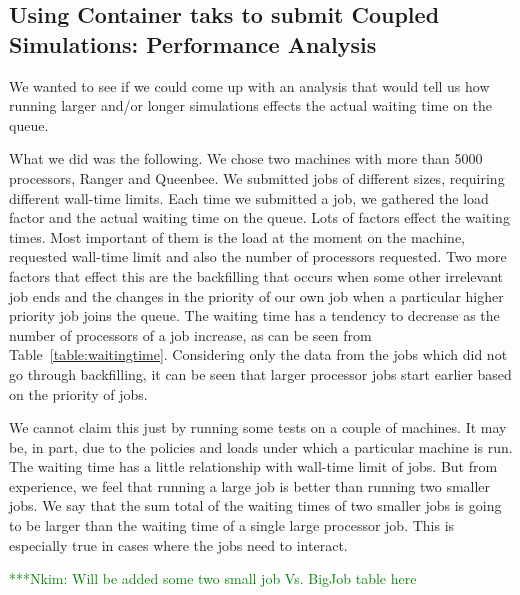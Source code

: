 \documentclass[conference,final]{IEEEtran}
\newcommand{\Nkimnote}[1]{ {\textcolor{green} { ***Nkim: #1 }}}
\newcommand{\Nkimnote}[1]{}
\begin{document}



\subsection{Using Container taks to submit Coupled Simulations:
  Performance Analysis}


We wanted to see if we could come up with an analysis that would tell us how running larger and/or longer simulations effects the actual waiting time on the queue.

What we did was the following. We chose two machines with more than 5000 processors, Ranger and Queenbee. We submitted jobs of different sizes, requiring different wall-time limits. Each time we submitted a job, we gathered the load factor and the actual waiting time on the queue. Lots of factors effect the waiting times. Most important of them is the load at the moment on the machine, requested wall-time limit and also the number of processors requested. Two more factors that effect this are the backfilling that occurs when some other irrelevant job ends and the changes in the priority of our own job when a particular higher priority job joins the queue. 
The waiting time has a tendency to decrease as the number of processors of a job increase, as can be seen from Table~\ref{table:waitingtime}.
Considering only the data from the jobs which did not go through backfilling, it can be seen that larger processor jobs start earlier based on the priority of jobs.

We cannot claim this just by running some tests on a couple of machines. It may be, in part, due to the policies and loads under which a particular machine is run. The waiting time has a little relationship with wall-time limit of jobs. But from experience, we feel that running a large job is better than running two smaller jobs. We say that the sum total of the waiting times of two smaller jobs is going to be larger than the waiting time of a single large processor job. This is especially true in cases where the jobs need to interact.

\Nkimnote{Will be added some two small job Vs. BigJob table here}
\end{document}
